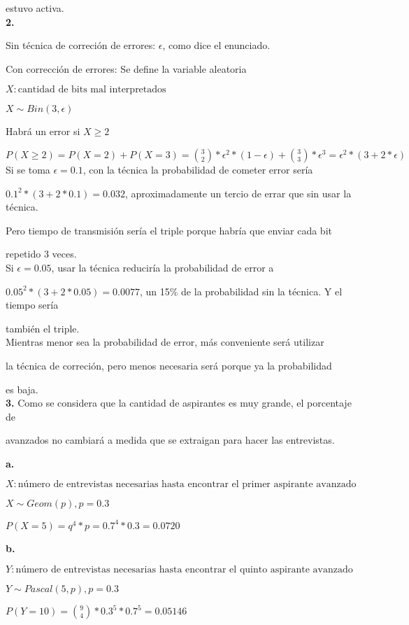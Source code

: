 \documentclass[12pt,fleqn]{article}
\begin{document}
estuvo activa.
\\

\textbf{2.}

Sin técnica de correción de errores: $\epsilon$, como dice el enunciado.

Con corrección de errores: Se define la variable aleatoria

$X: \textrm{cantidad de bits mal interpretados}$

$X \sim Bin(3,\epsilon)$

Habrá un error si $X \ge 2$

$P(X \ge 2)=P(X=2)+P(X=3)=\binom{3}{2}*\epsilon^2*(1-\epsilon)+\binom{3}{3}*\epsilon^3=\epsilon^2*(3+2*\epsilon)$
\\

Si se toma $\epsilon=0.1$, con la técnica la probabilidad de cometer error sería

$0.1^2*(3+2*0.1)=0.032$, aproximadamente un tercio de errar que sin usar la técnica.

Pero tiempo de transmisión sería el triple porque habría que enviar cada bit

repetido 3 veces.
\\

Si $\epsilon=0.05$, usar la técnica reduciría la probabilidad de error a

$0.05^2*(3+2*0.05)=0.0077$, un 15\% de la probabilidad sin la técnica. Y el tiempo sería

también el triple.
\\

Mientras menor sea la probabilidad de error, más conveniente será utilizar

la técnica de correción, pero menos necesaria será porque ya la probabilidad

es baja.
\\

\textbf{3.}
Como se considera que la cantidad de aspirantes es muy grande, el porcentaje de

avanzados no cambiará a medida que se extraigan para hacer las entrevistas.

\textbf{a.}

$X: \textrm{número de entrevistas necesarias hasta encontrar el primer aspirante avanzado}$

$X \sim Geom(p), p=0.3$

$P(X=5)=q^4*p=0.7^4*0.3=0.0720$

\textbf{b.}

$Y: \textrm{número de entrevistas necesarias hasta encontrar el quinto aspirante avanzado}$

$Y \sim Pascal(5,p), p=0.3$

$P(Y=10)=\binom{9}{4}*0.3^5*0.7^5=0.05146$
\end{document}
